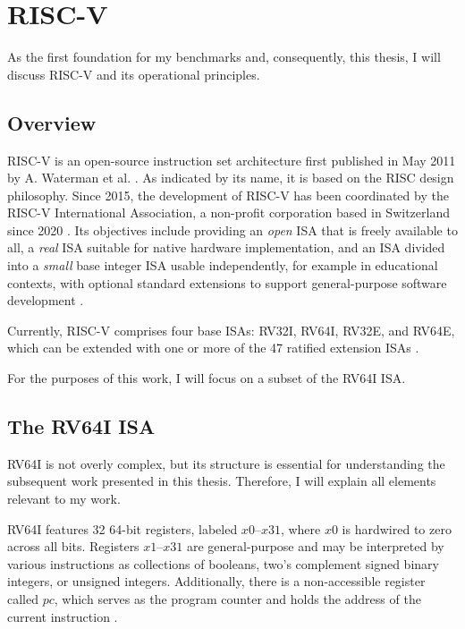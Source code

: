 \chapter{RISC-V}\label{chap:riscv}

As the first foundation for my benchmarks and, consequently, this
thesis, I will discuss RISC-V and its operational principles.

\section{Overview}

RISC-V is an open-source instruction set architecture first published
in May 2011 by A. Waterman et al. \cite{first_riscv}. As indicated by
its name, it is based on the RISC design philosophy.  Since 2015, the development of RISC-V has been
coordinated by the RISC-V International Association, a non-profit
corporation based in Switzerland since 2020 \cite{riscvorg}. Its
objectives include providing an \emph{open} ISA that is freely
available to all, a \emph{real} ISA suitable for native hardware
implementation, and an ISA divided into a \emph{small} base integer
ISA usable independently, for example in educational contexts, with
optional standard extensions to support general-purpose software
development \cite[Chapter 1]{riscv-isa}.

Currently, RISC-V comprises four base ISAs: RV32I, RV64I, RV32E, and
RV64E, which can be extended with one or more of the 47 ratified
extension ISAs \cite[Preface]{riscv-isa}.

 

For the purposes of this work, I will focus on a subset of the RV64I
ISA.

\section{The RV64I ISA} \label{sec:riscvIsa}
RV64I is not overly complex, but its structure is essential for
understanding the subsequent work presented in this thesis.
Therefore, I will explain all elements relevant to my work.

RV64I features 32 64-bit registers, labeled $x0$–$x31$, where $x0$ is
hardwired to zero across all bits. Registers $x1$–$x31$ are
general-purpose and may be interpreted by various instructions as
collections of booleans, two's complement signed binary integers, or
unsigned integers. Additionally, there is a non-accessible register
called $pc$, which serves as the program counter and holds the
address of the current instruction \cite[Chapters 4.1,
      2.1]{riscv-isa}.


